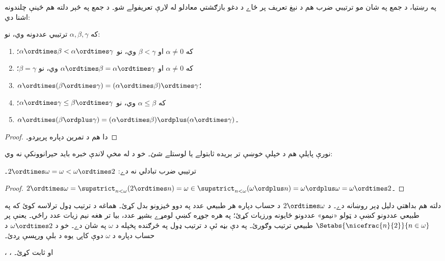 \documentclass[../../../include/open-logic-section]{subfiles}
\begin{document}
په رښتيا، د جمع په شان مو ترتيبي ضرب هم د نېغ تعريف پر ځاے د
دغو بازګشتي معادلو له لارې تعريفولے شو۔ د جمع په څېر دلته هم
ځينې چلندونه اشنا دي:

\begin{lem}
که $\alpha, \beta, \gamma$ ترتيبي عددونه وي، نو:
\begin{enumerate}
	\item{} که $\alpha \neq 0$ او $\beta < \gamma$
	وي، نو $\alpha \ordtimes \beta < \alpha \ordtimes \gamma$؛
	\item{} که $\alpha \neq 0$ او $\alpha \ordtimes
	\beta = \alpha\ordtimes\gamma$ وي، نو $\beta = \gamma$؛
	\item{} $\alpha \ordtimes (\beta \ordtimes
	\gamma) = (\alpha \ordtimes \beta) \ordtimes \gamma$؛
	\item{} که $\alpha \leq \beta$ وي، نو $\alpha
	\ordtimes \gamma \leq \beta \ordtimes \gamma$؛
	\item{} $\alpha \ordtimes (\beta \ordplus
	\gamma) = (\alpha \ordtimes \beta )\ordplus (\alpha\ordtimes
	\gamma)$۔
\end{enumerate}
\end{lem}

\begin{proof}
دا هم د تمرين دپاره پرېږدو۔
\end{proof}

نورې پايلې هم د خپلې خوښې تر بريده ثابتولے يا لوستلے شئ۔ خو د
 له مخې لاندې خبره
بايد حيرانوونکې نه وي:

\begin{prop}
ترتيبي ضرب تبادلي نه دے: $2 \ordtimes \omega  =
\omega < \omega \ordtimes 2$۔
\end{prop}

\begin{proof}
$2 \ordtimes \omega = \supstrict_{n < \omega}(2\ordtimes  n) = \omega \in \supstrict_{n < \omega}(\omega \ordplus n) = \omega \ordplus \omega = \omega \ordtimes 2$۔
\end{proof}
\noindent
دلته هم بداهتي دليل ډېر روښانه دے۔ د $2
\ordtimes \omega$ د حساب دپاره هر طبيعي عدد په دوو څيزونو بدل کړئ۔
هماغه د ترتيب ډول ترلاسه کوئ که په طبيعي عددونو کښې د ټولو
«نيمو» عددونو ځايونه ورزيات کړئ؛ په هره جوړه کښې لومړے
بشپړ عدد، بيا تر هغه نيم زيات عدد راځي۔ يعنې پر
$\Setabs{\nicefrac{n}{2}}{n \in \omega}$ طبيعي ترتيب وګورئ۔
په دې بڼه ئې د ترتيب ډول په څرګنده پخپله د $\omega$ په شان دے۔
خو د $\omega \ordtimes 2$ د حساب دپاره د $\omega$ دوې کاپۍ
يوه د بلې ورپسې ږدئ۔

\begin{prob}
،
،
او 
ثابت کړئ۔
\end{prob}
\end{document}
